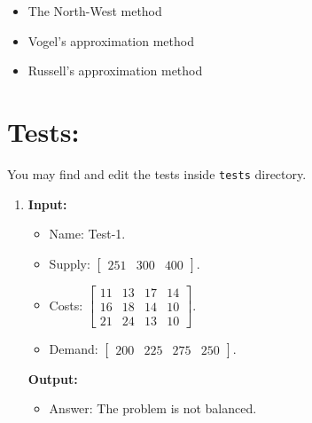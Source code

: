 \documentclass{article}
\begin{document}
\begin{itemize}
    \item The North-West method
    \item Vogel’s approximation method
    \item  Russell’s approximation method
\end{itemize}

\newpage

\section*{Tests:}

You may find and edit the tests inside \texttt{tests} directory.

\begin{enumerate}[label={(\arabic*)}, itemsep=0.25in]
    \item \textbf{Input:}
          \begin{itemize}
              \item Name: Test-1.
              \item Supply: \(\begin{bmatrix} 251 & 300 & 400 \end{bmatrix}\).
              \item Costs: \(\begin{bmatrix}
              11 & 13 & 17 & 14 \\
              16 & 18 & 14 & 10 \\
              21 & 24 & 13 & 10
              \end{bmatrix}\).
              \item Demand: \(\begin{bmatrix} 200 & 225 & 275 & 250 \end{bmatrix}\).
          \end{itemize}        
          \textbf{Output:}
          \begin{itemize}
            \item Answer: The problem is not balanced.
          \end{itemize}


\end{enumerate}
\end{document}

